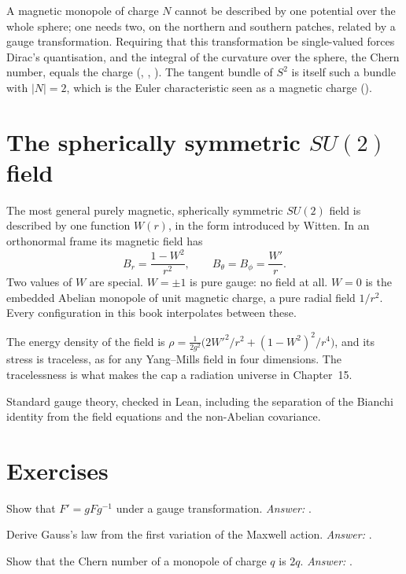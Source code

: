 A magnetic monopole of charge $N$ cannot be described by one potential over the whole sphere; one needs two, on the northern and southern patches, related by a gauge transformation. Requiring that this transformation be single-valued forces Dirac's quantisation, and the integral of the curvature over the sphere, the Chern number, equals the charge (, , ). The tangent bundle of $S^2$ is itself such a bundle with $|N|=2$, which is the Euler characteristic seen as a magnetic charge ().

\section{The spherically symmetric $SU(2)$ field}

The most general purely magnetic, spherically symmetric $SU(2)$ field is described by one function $W(r)$, in the form introduced by Witten. In an orthonormal frame its magnetic field has
\[
B_r=\frac{1-W^2}{r^2},\qquad B_\theta=B_\phi=\frac{W'}{r}.
\]
Two values of $W$ are special. $W=\pm1$ is pure gauge: no field at all. $W=0$ is the embedded Abelian monopole of unit magnetic charge, a pure radial field $1/r^2$. Every configuration in this book interpolates between these.

The energy density of the field is $\rho=\frac{1}{2g^2}\bigl(2W'^2/r^2+(1-W^2)^2/r^4\bigr)$, and its stress is traceless, as for any Yang--Mills field in four dimensions. The tracelessness is what makes the cap a radiation universe in Chapter~15.

\begin{standsbox}
Standard gauge theory, checked in Lean, including the separation of the Bianchi identity from the field equations and the non-Abelian covariance.
\end{standsbox}

\section*{Exercises}
\begin{exercise}Show that $F'=gFg^{-1}$ under a gauge transformation. \emph{Answer:} .\end{exercise}
\begin{exercise}Derive Gauss's law from the first variation of the Maxwell action. \emph{Answer:} .\end{exercise}
\begin{exercise}Show that the Chern number of a monopole of charge $q$ is $2q$. \emph{Answer:} .\end{exercise}
